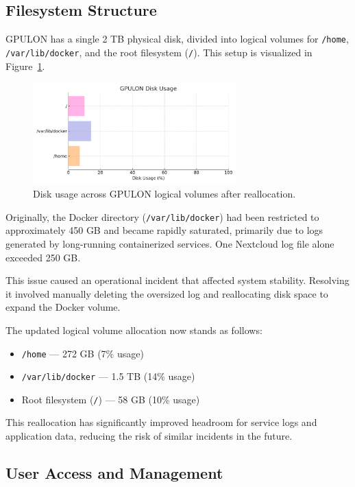 \subsection*{Filesystem Structure}

GPULON has a single 2 TB physical disk, divided into logical volumes for \texttt{/home}, \texttt{/var/lib/docker}, and the root filesystem (\texttt{/}). This setup is visualized in Figure~\ref{fig:gpulon_disk_usage}.

\begin{figure}[H]
  \centering
  \includegraphics[width=0.7\textwidth]{figuras/gpulon_disk_usage.pdf}
  \caption{Disk usage across GPULON logical volumes after reallocation.}
  \label{fig:gpulon_disk_usage}
\end{figure}

Originally, the Docker directory (\texttt{/var/lib/docker}) had been restricted to approximately 450 GB and became rapidly saturated, primarily due to logs generated by long-running containerized services. One Nextcloud log file alone exceeded 250 GB.

This issue caused an operational incident that affected system stability. Resolving it involved manually deleting the oversized log and reallocating disk space to expand the Docker volume.

The updated logical volume allocation now stands as follows:

\begin{itemize}
    \item \texttt{/home} — 272 GB (7\% usage)
    \item \texttt{/var/lib/docker} — 1.5 TB (14\% usage)
    \item Root filesystem (\texttt{/}) — 58 GB (10\% usage)
\end{itemize}

This reallocation has significantly improved headroom for service logs and application data, reducing the risk of similar incidents in the future.

\subsection*{User Access and Management}

